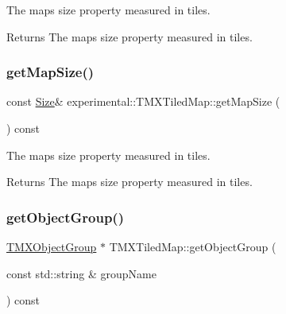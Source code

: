 The map\textquotesingle{}s size property measured in tiles.

\begin{DoxyReturn}{Returns}
The map\textquotesingle{}s size property measured in tiles. 
\end{DoxyReturn}
\mbox{\label{classexperimental_1_1TMXTiledMap_a4c7f3f5487c6c8e8e597dfbba31e7659}} 
\subsubsection{\texorpdfstring{get\+Map\+Size()}{getMapSize()}\hspace{0.1cm}{\footnotesize\ttfamily [2/2]}}
{\footnotesize\ttfamily const \hyperlink{classSize}{Size}\& experimental\+::\+T\+M\+X\+Tiled\+Map\+::get\+Map\+Size (\begin{DoxyParamCaption}{ }\end{DoxyParamCaption}) const\hspace{0.3cm}{\ttfamily [inline]}}

The map\textquotesingle{}s size property measured in tiles.

\begin{DoxyReturn}{Returns}
The map\textquotesingle{}s size property measured in tiles. 
\end{DoxyReturn}
\mbox{\label{classexperimental_1_1TMXTiledMap_a4addb02e0b8a56ab145b3a4162b4e6b8}} 
\subsubsection{\texorpdfstring{get\+Object\+Group()}{getObjectGroup()}\hspace{0.1cm}{\footnotesize\ttfamily [1/2]}}
{\footnotesize\ttfamily \hyperlink{classTMXObjectGroup}{T\+M\+X\+Object\+Group} $\ast$ T\+M\+X\+Tiled\+Map\+::get\+Object\+Group (\begin{DoxyParamCaption}\item[{const std\+::string \&}]{group\+Name }\end{DoxyParamCaption}) const}

